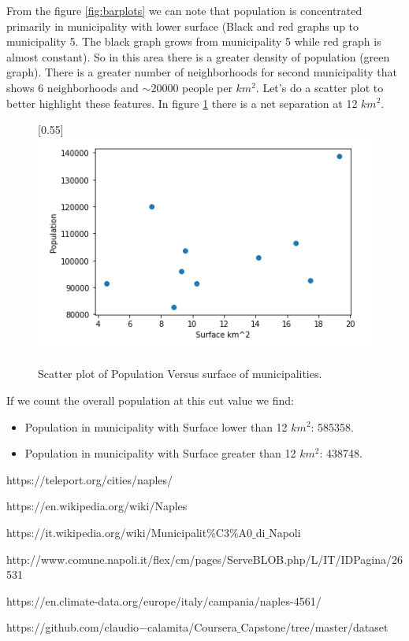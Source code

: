 \documentclass[a4paper, 12pt, oneside]{book}
\begin{document}
From the figure \ref{fig:barplots}  we can note that population is concentrated primarily in municipality with lower surface (Black and red graphs up to municipality 5. The black graph grows from municipality 5 while red graph is almost constant). So in this area there is a greater density of population (green graph). There is a greater number of neighborhoods for second municipality that shows 6 neighborhoods and $\sim 20000$ people per $km^2$.
Let's do a scatter plot to better highlight these features. In figure \ref{fig:population_surface} there is a net separation at 12 $km^2$. 

\begin{figure}[!htb]
		\centering
		\scalebox{0.5}[0.55]{\includegraphics{immagini/population_surface.png}}
		\caption{Scatter plot of Population Versus surface of municipalities.}
		\label{fig:population_surface}
	\end{figure}

If we count the overall population at this cut value we find: 
\begin{itemize}
\item Population in municipality with Surface lower than 12 $km^2$: 585358.
\item Population in municipality with Surface greater than 12 $km^2$: 438748.
\end{itemize}




\begin{thebibliography}{9}
https://teleport.org/cities/naples/
 
https://en.wikipedia.org/wiki/Naples

https://it.wikipedia.org/wiki/Municipalit$\%$C3$\%$A0$\_$di$\_$Napoli

http://www.comune.napoli.it/flex/cm/pages/ServeBLOB.php/L/IT/IDPagina/26531 

https://en.climate-data.org/europe/italy/campania/naples-4561/

https://github.com/claudio$-$calamita/Coursera$\_$Capstone/tree/master/dataset

\end{thebibliography}
\end{document}
